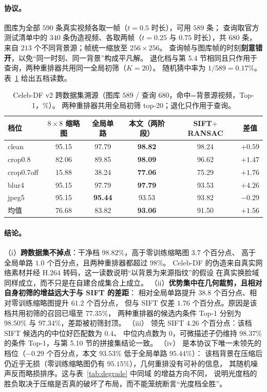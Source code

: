 \paragraph{协议。}图库为全部 $590$ 条真实视频各取一帧（$t=0.5$ 时长），可用 $589$ 条；
查询取官方测试清单中的 $340$ 条伪造视频、各取两帧（$t=0.25$ 与 $0.75$ 时长），共 $680$ 条，
来自 $213$ 个不同背景源；帧统一缩放至 $256\times256$。
查询帧与图库帧的时刻\textbf{刻意错开}，以免“同一时刻、同一背景”构成平凡解。
退化档与第 5.4 节相同且只作用于查询，两种重排器共用同一全局初筛（$K=20$）。
随机猜中率为 $1/589=0.17\%$。表~\ref{tab:celebdf} 给出五档读数。

\begin{table}[t]
\centering
\caption{Celeb-DF v2 跨数据集溯源（图库 $589$ / 查询 $680$，命中=背景源视频，Top-1，\%）。
两种重排器共用全局初筛 top-20；退化只作用于查询。}
\label{tab:celebdf}
\small
\begin{tabular}{lccccc}
\toprule
档位 & $8\times8$ 缩略图 & 全局单路 & \textbf{本文（两阶段）} & SIFT$+$RANSAC & 差值 \\
\midrule
clean      & 95.15 & 97.79 & \textbf{98.82} & 98.24 & $+0.59$ \\
crop0.8    & 82.06 & 89.85 & \textbf{98.09} & 96.62 & $+1.47$ \\
crop0.7off & 15.88 & 38.24 & \textbf{77.06} & 75.29 & $+1.76$ \\
blur4      & 95.15 & 97.79 & \textbf{97.79} & 93.53 & $\mathbf{+4.26}$ \\
jpeg5      & 95.15 & \textbf{95.44} & 93.53 & 93.82 & $-0.29$ \\
\midrule
均值       & 76.68 & 83.82 & \textbf{93.06} & 91.50 & $+1.56$ \\
\bottomrule
\end{tabular}
\end{table}

\paragraph{结论。}（i）\textbf{跨数据集不掉点}：干净档 $98.82\%$，高于零训练缩略图 $3.7$ 个百分点、
高于全局单路 $1.0$ 个百分点，且两种重排器都超过 $98\%$。
Celeb-DF 的伪造来自真实网络素材并经 H.264 转码，这一读数说明“以背景为来源指纹”的假设
在真实换脸域同样成立，而不只是在自建合成集合上成立。
（ii）\textbf{优势集中在几何裁剪，且相对自身初筛的增益远大于与 SIFT 的差距}：
 相对全局单路提升 $38.8$ 个百分点、相对零训练缩略图提升 $61.2$ 个百分点，
但与 SIFT 仅差 $1.76$ 个百分点。原因是该档共用初筛的召回已塌至 $77.35\%$，
两种重排器的候选内条件 Top-1 分别为 $98.50\%$ 与 $97.34\%$，差距被初筛封顶。
（iii） 领先 SIFT $4.26$ 个百分点：该档 SIFT 候选内的中位好匹配数为 $0.4$、
中位内点数为 $0$，可微描述子仍维持 $98.37\%$ 的条件 Top-1，与第 5.10 节的拼接集结论一致。
（iv） 是本协议下唯一未领先的档位（$-0.29$ 个百分点，本文 $93.53\%$ 低于全局单路 $95.44\%$）：
该档背景在压缩后仍近乎无损（零训练缩略图仍有 $95.15\%$），几何重排没有可补的信息，
其随机噪声反而略损排序。这与表~\ref{tab:degrade} 中同域  的增益方向不同，
说明光度档的胜负取决于压缩是否真的破坏了布局，而不能笼统断言“光度档全胜”。


